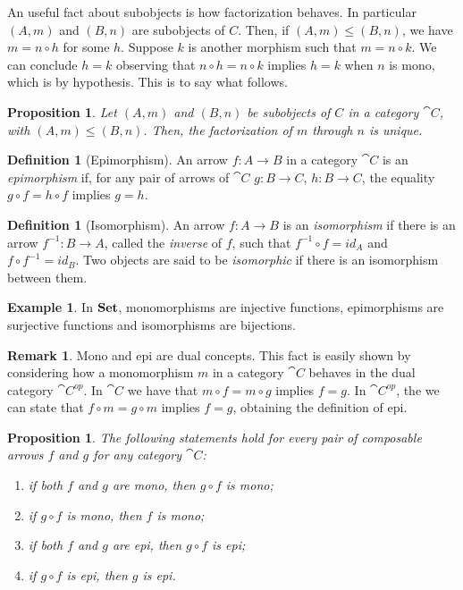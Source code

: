 \documentclass[a4paper, twoside,openright]{report}
\theoremstyle{plain}
\newtheorem{prop}[theorem]{Proposition}
\theoremstyle{definition}
\newtheorem{definition}[theorem]{Definition}
\newtheorem{example}[theorem]{Example}
\newtheorem{remark}[theorem]{Remark}
\begin{document}
An useful fact about subobjects is how factorization behaves. In particular $(A, m)$ and $(B, n)$ are subobjects of $C$. Then, if $(A, m)\leq (B, n)$, we have $m = n \circ h$ for some $h$. Suppose $k$ is another morphism such that $m = n \circ k$. We can conclude $h = k$ observing that $n \circ h = n \circ k$ implies $h = k$ when $n$ is mono, which is by hypothesis. This is to say what follows.

\begin{prop}\label{prop:fact_of_subobjects_is_unique}
    Let $(A, m)$ and $(B, n)$ be subobjects of $C$ in a category $\cat C$, with $(A, m)\leq (B, n)$. Then, the factorization of $m$ through $n$ is unique.
\end{prop}


\begin{definition}[Epimorphism]\label{def:epi}
    An arrow $f: A\rightarrow B$ in a category $\cat{C}$ is an \emph{epimorphism} if, for any pair of arrows of $\cat{C}$ $g : B \rightarrow C$, $h: B \rightarrow C$, the equality $g \circ f = h \circ f$ implies $g = h$.
\end{definition}

\begin{definition}[Isomorphism]\label{def:iso}
    An arrow $f:A \rightarrow B$ is an \emph{isomorphism} if there is an arrow $f^{-1}:B \rightarrow A$, called the \emph{inverse} of $f$, such that $f^{-1}\circ f = id_{A}$ and $f \circ f^{-1} = id_{B}$. Two objects are said to be \emph{isomorphic} if there is an isomorphism between them.
\end{definition}

\begin{example}
    In $\mathbf{Set}$, monomorphisms are injective functions, epimorphisms are surjective functions and isomorphisms are bijections.
\end{example}

\begin{remark}
    Mono and epi are dual concepts. This fact is easily shown by considering how a monomorphism $m$ in a category $\cat C$ behaves in the dual category $\cat C^{op}$.
    In $\cat C$ we have that $m \circ f = m \circ g$ implies $f = g$. In $\cat C^{op}$, the we can state that $f \circ m = g \circ m$ implies $f = g$, obtaining the definition of epi. 
\end{remark}

\begin{prop}\label{prop:epi_mono_prop}
    The following statements hold for every pair of composable arrows $f$ and $g$ for any category $\cat C$:
    \begin{enumerate}
        \item if both $f$ and $g$ are mono, then $g \circ f$ is mono;
        \item if $g \circ f$ is mono, then $f$ is mono;
        \item if both $f$ and $g$ are epi, then $g \circ f$ is epi;
        \item if $g \circ f$ is epi, then $g$ is epi.
    \end{enumerate}
\end{prop}
\end{document}
